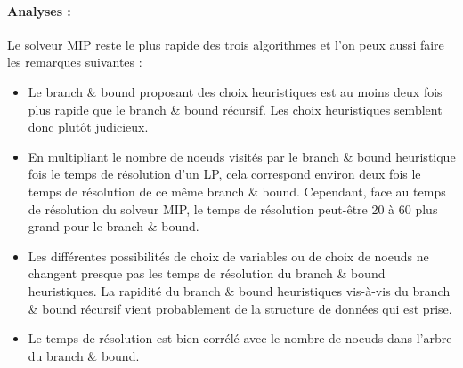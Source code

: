 \documentclass[a4paper,10pt]{article}
\begin{document}
\paragraph{Analyses : }
Le solveur MIP reste le plus rapide des trois algorithmes et l'on peux aussi faire les remarques suivantes :
\begin{itemize}
\item Le branch \& bound proposant des choix heuristiques est au moins deux fois plus rapide que le branch \& bound récursif. Les choix heuristiques semblent donc plutôt judicieux. 
\item En multipliant le nombre de noeuds visités par le branch \& bound heuristique fois le temps de résolution d'un LP, cela correspond environ deux fois le temps de résolution de ce même branch \& bound. Cependant, face au temps de résolution du solveur MIP, le temps de résolution peut-être 20 à 60 plus grand pour le branch \& bound. 
\item Les différentes possibilités de choix de variables ou de choix de noeuds ne changent presque pas les temps de résolution du branch \& bound heuristiques. La rapidité du branch \& bound heuristiques vis-à-vis du branch \& bound récursif vient probablement de la structure de données qui est prise.
\item Le temps de résolution est bien corrélé avec le nombre de noeuds dans l'arbre du branch \& bound.
\end{itemize}
\end{document}

